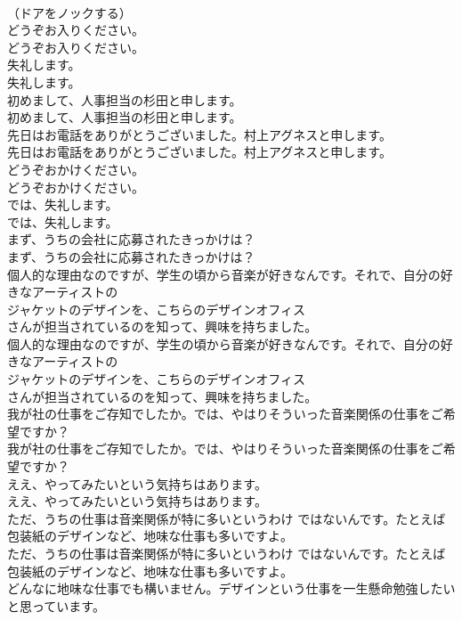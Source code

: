 \documentclass[8pt]{extreport}
\begin{document}
\begin{CJK}{UTF8}{min}
\\	（ドアをノックする）	
\\	どうぞお入りください。	
\\	どうぞお入りください。 
\\	失礼します。	
\\	失礼します。 
\\	初めまして、人事担当の杉田と申します。	
\\	初めまして、人事担当の杉田と申します。 
\\	先日はお電話をありがとうございました。村上アグネスと申します。	
\\	先日はお電話をありがとうございました。村上アグネスと申します。 
\\	どうぞおかけください。	
\\	どうぞおかけください。 
\\	では、失礼します。	
\\	では、失礼します。 
\\	まず、うちの会社に応募されたきっかけは？	
\\	まず、うちの会社に応募されたきっかけは？ 
\\	個人的な理由なのですが、学生の頃から音楽が好きなんです。それで、自分の好きなアーティストの
\\	ジャケットのデザインを、こちらのデザインオフィス
\\	さんが担当されているのを知って、興味を持ちました。	
\\	個人的な理由なのですが、学生の頃から音楽が好きなんです。それで、自分の好きなアーティストの
\\	ジャケットのデザインを、こちらのデザインオフィス
\\	さんが担当されているのを知って、興味を持ちました。 
\\	我が社の仕事をご存知でしたか。では、やはりそういった音楽関係の仕事をご希望ですか？	
\\	我が社の仕事をご存知でしたか。では、やはりそういった音楽関係の仕事をご希望ですか？ 
\\	ええ、やってみたいという気持ちはあります。	
\\	ええ、やってみたいという気持ちはあります。 
\\	ただ、うちの仕事は音楽関係が特に多いというわけ ではないんです。たとえば包装紙のデザインなど、地味な仕事も多いですよ。	
\\	ただ、うちの仕事は音楽関係が特に多いというわけ ではないんです。たとえば包装紙のデザインなど、地味な仕事も多いですよ。 
\\	どんなに地味な仕事でも構いません。デザインという仕事を一生懸命勉強したいと思っています。	

\end{CJK}
\end{document}
